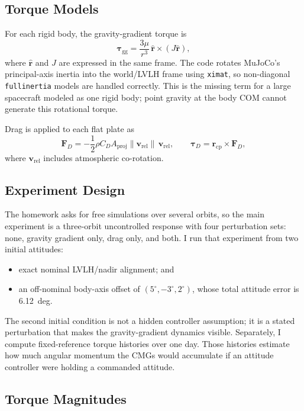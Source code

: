 \documentclass[conference]{IEEEtran}
\begin{document}
\subsection{Torque Models}

For each rigid body, the gravity-gradient torque is
\begin{equation}
  \bm\tau_\text{gg}
    = \frac{3\mu}{r^3}\,\hat{\bm r}\times
      \left(J\hat{\bm r}\right),
  \label{eq:gg-torque}
\end{equation}
where $\hat{\bm r}$ and $J$ are expressed in the same frame.  The code
rotates MuJoCo's principal-axis inertia into the world/LVLH frame using
\texttt{ximat}, so non-diagonal \texttt{fullinertia} models are handled
correctly.  This is the missing term for a large spacecraft modeled as
one rigid body; point gravity at the body COM cannot generate this
rotational torque.

Drag is applied to each flat plate as
\begin{equation}
  \bm F_D
    = -\frac12 \rho C_D A_\text{proj}
      \|\bm v_\text{rel}\|\,\bm v_\text{rel},
  \qquad
  \bm\tau_D = \bm r_\text{cp}\times\bm F_D ,
  \label{eq:drag-torque}
\end{equation}
where $\bm v_\text{rel}$ includes atmospheric co-rotation.

\subsection{Experiment Design}

The homework asks for free simulations over several orbits, so the main
experiment is a three-orbit uncontrolled response with four perturbation
sets: none, gravity gradient only, drag only, and both.  I run that
experiment from two initial attitudes:
\begin{itemize}
  \item exact nominal LVLH/nadir alignment; and
  \item an off-nominal body-axis offset of
        $(5^\circ,-3^\circ,2^\circ)$, whose total attitude error is
        \SI{6.12}{deg}.
\end{itemize}
The second initial condition is not a hidden controller assumption; it
is a stated perturbation that makes the gravity-gradient dynamics
visible.  Separately, I compute fixed-reference torque histories over
one day.  Those histories estimate how much angular momentum the CMGs
would accumulate if an attitude controller were holding a commanded
attitude.

\subsection{Torque Magnitudes}
\end{document}

